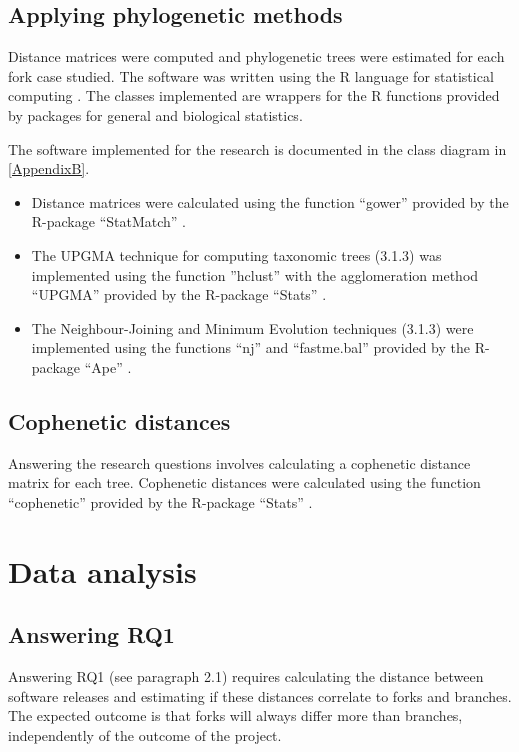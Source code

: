 

\subsection{Applying phylogenetic methods}
Distance matrices were computed and phylogenetic trees were estimated for each fork case studied. The software was written using the R language for statistical computing \citep{RDevelopmentCoreTeam2008a}. The classes implemented are wrappers for the R functions provided by packages for general and biological statistics. 

The software implemented for the research is documented in the class diagram in \ref{AppendixB}.

\begin{itemize}
\item{Distance matrices were calculated using the function “gower” provided by the R-package “StatMatch” \citep{DOrazio2016}.}

\item{The UPGMA technique for computing taxonomic trees (3.1.3) was implemented using the function ”hclust” with the agglomeration method “UPGMA” provided by the R-package “Stats” \citep[p.1355]{RDevelopmentCoreTeam2008a}.}

\item{The Neighbour-Joining and Minimum Evolution techniques (3.1.3) were implemented using the functions “nj” and “fastme.bal” provided by the R-package “Ape” \citep{Paradis2004a}.}
\end{itemize}

\subsection{Cophenetic distances}
Answering the research questions involves calculating a cophenetic distance matrix for each tree. Cophenetic distances were calculated using the function “cophenetic” provided by the R-package “Stats” \citep[p.1275]{RDevelopmentCoreTeam2008a}.


\section{Data analysis}

\subsection{Answering RQ1}
Answering RQ1 (see paragraph 2.1) requires calculating the distance between software releases and estimating if these distances correlate to forks and branches. The expected outcome is that forks will always differ more than branches, independently of the outcome of the project.

